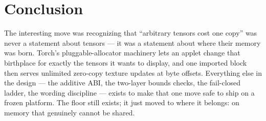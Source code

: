 \documentclass[11pt]{article}
\begin{document}
\section{Conclusion}

The interesting move was recognizing that ``arbitrary tensors cost one copy''
was never a statement about tensors --- it was a statement about where their
memory was born. Torch's pluggable-allocator machinery lets an applet change
that birthplace for exactly the tensors it wants to display, and one
imported block then serves unlimited zero-copy texture updates at byte
offsets. Everything else in the design --- the additive ABI, the two-layer
bounds checks, the fail-closed ladder, the wording discipline --- exists to
make that one move safe to ship on a frozen platform. The floor still exists;
it just moved to where it belongs: on memory that genuinely cannot be shared.
\end{document}
